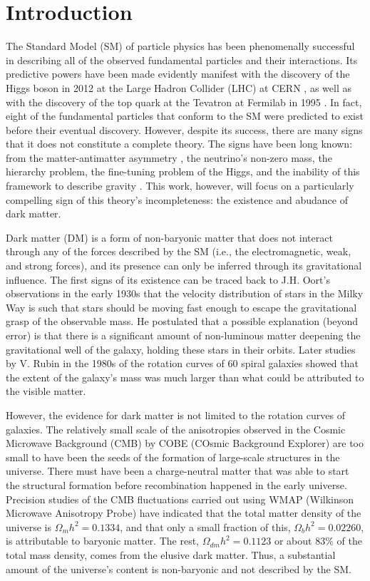 \chapter{Introduction}

The Standard Model (SM) of particle physics has been phenomenally successful in describing all of the observed fundamental particles and their interactions. Its predictive powers have been made evidently manifest with the discovery of the Higgs boson in 2012 at the Large Hadron Collider (LHC) at CERN \cite{collaborationObservationNewBoson2012}, as well as with the discovery of the top quark at the Tevatron at Fermilab in 1995 \cite{abachiObservationTopQuark1995}. In fact, eight of the fundamental particles that conform to the SM were predicted to exist before their eventual discovery. However, despite its success, there are many signs that it does not constitute a complete theory. The signs have been long known: from the matter-antimatter asymmetry \cite{}, the neutrino's non-zero mass, the hierarchy problem, the fine-tuning problem of the Higgs, and the inability of this framework to describe gravity \cite{}. This work, however, will focus on a particularly compelling sign of this theory's incompleteness: the existence and abudance of dark matter.

Dark matter (DM) is a form of non-baryonic matter that does not interact through any of the forces described by the SM (i.e., the electromagnetic, weak, and strong forces), and its presence can only be inferred through its gravitational influence. The first signs of its existence can be traced back to J.H. Oort's observations in the early 1930s that the velocity distribution of stars in the Milky Way is such that stars should be moving fast enough to escape the gravitational grasp of the observable mass. He postulated that a possible explanation (beyond error) is that there is a significant amount of non-luminous matter deepening the gravitational well of the galaxy, holding these stars in their orbits. Later studies by V. Rubin in the 1980s of the rotation curves of 60 spiral galaxies showed that the extent of the galaxy's mass was much larger than what could be attributed to the visible matter.

However, the evidence for dark matter is not limited to the rotation curves of galaxies. The relatively small scale of the anisotropies observed in the Cosmic Microwave Background (CMB) by COBE (COsmic Background Explorer) are too small to have been the seeds of the formation of large-scale structures in the universe. There must have been a charge-neutral matter that was able to start the structural formation before recombination happened in the early universe. Precision studies of the CMB fluctuations carried out using WMAP (Wilkinson Microwave Anisotropy Probe) have indicated that the total matter density of the universe is $\Omega_{m}h^2 = 0.1334$, and that only a small fraction of this, $\Omega_{b}h^2 = 0.02260$, is attributable to baryonic matter. The rest, $\Omega_{dm}h^2 = 0.1123$ or about $83\%$ of the total mass density, comes from the elusive dark matter. Thus, a substantial amount of the universe's content is non-baryonic and not described by the SM.


